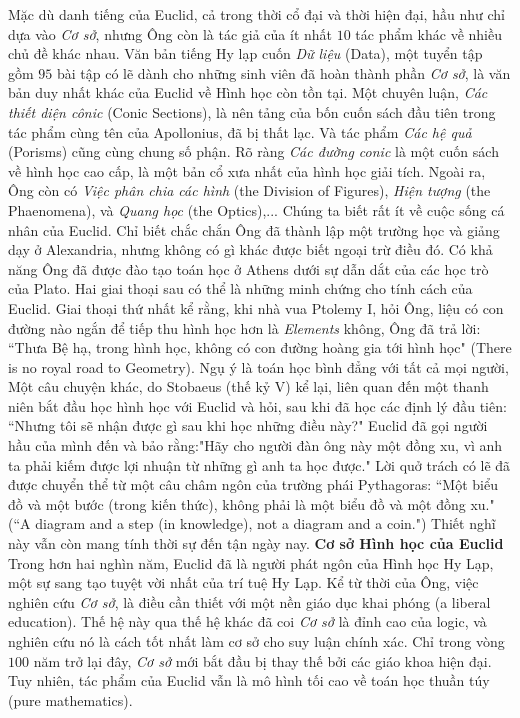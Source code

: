\begin{multicols}{2}
	\vskip 0.1cm
	Mặc dù danh tiếng của Euclid, cả trong thời cổ đại và thời hiện đại, hầu như chỉ dựa vào \textit{Cơ sở}, nhưng Ông còn là tác giả của ít nhất $10$ tác phẩm khác về nhiều chủ đề khác nhau. Văn bản tiếng Hy lạp cuốn \textit{Dữ liệu} (Data), một tuyển tập gồm $95$ bài tập có lẽ dành cho những sinh viên đã hoàn thành phần \textit{Cơ sở}, là văn bản duy nhất khác của Euclid về Hình học còn tồn tại. Một chuyên luận, \textit{Các thiết diện cônic} (Conic Sections), là nên tảng của bốn cuốn sách đầu tiên trong tác phẩm cùng tên của Apollonius, đã bị thất lạc. Và tác phẩm \textit{Các hệ quả} (Porisms) cũng cùng chung số phận. Rõ ràng \textit{Các đường conic} là một cuốn sách về hình học cao cấp, là một bản cổ xưa nhất của hình học giải tích. Ngoài ra, Ông còn có \textit{Việc phân chia các  hình} (the Division of Figures), \textit{Hiện tượng} (the Phaenomena), và \textit{Quang học} (the Optics),...
	\vskip 0.1cm
	Chúng ta biết rất ít về cuộc sống cá nhân của Euclid.  Chỉ biết chắc chắn Ông đã thành lập một trường học và giảng dạy ở Alexandria, nhưng không có gì khác được biết ngoại trừ điều đó. Có khả năng Ông đã được đào tạo toán học ở Athens dưới sự dẫn dắt của các học trò của Plato. Hai giai thoại sau có thể là những minh chứng cho tính cách của Euclid. Giai thoại thứ nhất kể rằng, khi nhà vua Ptolemy I, hỏi Ông, liệu có con đường nào ngắn để tiếp thu hình học hơn là \textit{Elements} không, Ông đã trả lời: ``Thưa Bệ hạ, trong hình học, không có con đường hoàng gia tới hình học" (There is no royal road to Geometry). Ngụ ý là toán học bình đẳng với tất cả mọi người, Một câu chuyện khác, do Stobaeus (thế kỷ V) kể lại, liên quan đến một thanh niên bắt đầu học hình học với Euclid và hỏi, sau khi đã học các định lý đầu tiên: ``Nhưng tôi sẽ nhận được gì sau khi học những điều này?" Euclid đã gọi người hầu của mình đến và bảo rằng:"Hãy cho người đàn ông này một đồng xu, vì anh ta phải kiếm được lợi nhuận từ những gì anh ta học được." Lời quở trách có lẽ đã được chuyển thể từ một câu châm ngôn của trường phái Pythagoras: ``Một biểu đồ và một bước (trong kiến thức), không phải là một biểu đồ và một đồng xu." (``A diagram and a step (in knowledge), not a diagram and a coin.")  
	\vskip 0.1cm
	Thiết nghĩ này vẫn còn mang tính thời sự đến tận ngày nay.
	\vskip 0.1cm
	\textbf{\color{lichsutoanhoc}Cơ sở Hình học của Euclid}
	\vskip 0.1cm
	Trong hơn hai nghìn năm, Euclid đã là người phát ngôn của Hình học Hy Lạp, một sự sang tạo tuyệt vời nhất của trí tuệ Hy Lạp. Kể từ thời của Ông, việc nghiên cứu \textit{Cơ sở}, là điều cần thiết với một nền giáo dục khai phóng (a liberal education). Thế hệ này qua thế hệ khác đã coi \textit{Cơ sở} là đỉnh cao của logic, và nghiên cứu nó là cách tốt nhất làm cơ sở cho suy luận chính xác.  Chỉ trong vòng $100$ năm trở lại đây, \textit{Cơ sở} mới bắt đầu bị thay thế bởi các giáo khoa hiện đại. Tuy nhiên, tác phẩm của Euclid vẫn là mô hình tối cao về toán học thuần túy (pure mathematics).

\end{multicols}
